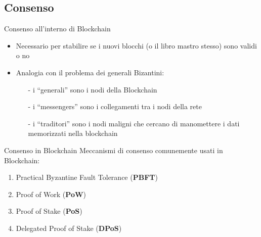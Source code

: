 \documentclass{beamer}
\begin{document}
  \subsection{Consenso}
  \begin{frame}{Consenso all'interno di Blockchain}
      \begin{itemize}
        \item Necessario per stabilire se i nuovi blocchi (o il libro mastro stesso) sono validi o no
        \item Analogia con il problema dei generali Bizantini:
        \begin{itemize}
            \item[-]i ``generali'' sono i nodi della Blockchain
            \item[-]i ``messengers'' sono i collegamenti tra i nodi della rete
            \item[-]i ``traditori'' sono i nodi maligni che cercano di manomettere i dati memorizzati nella blockchain
        \end{itemize} 
      \end{itemize}
  \end{frame}
  
  
  
  \begin{frame}{Consenso in Blockchain}
      Meccanismi di consenso comunemente usati in Blockchain: 
      \begin{enumerate}
        \item Practical Byzantine Fault Tolerance (\textbf{PBFT})
        \item Proof of Work (\textbf{PoW})
        \item Proof of Stake (\textbf{PoS})
        \item Delegated Proof of Stake (\textbf{DPoS})
      \end{enumerate}
  \end{frame}
\end{document}
